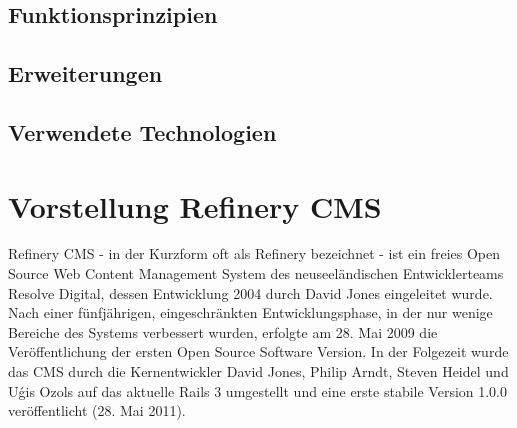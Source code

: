 \subsection{Funktionsprinzipien}
\subsection{Erweiterungen}
\subsection{Verwendete Technologien}

\newpage
\section{Vorstellung Refinery CMS}
Refinery CMS - in der Kurzform oft als Refinery bezeichnet - ist ein freies Open Source Web Content Management System des neuseeländischen Entwicklerteams Resolve Digital, dessen Entwicklung 2004 durch David Jones eingeleitet wurde. Nach einer fünfjährigen, eingeschränkten Entwicklungsphase, in der nur wenige Bereiche des Systems verbessert wurden, erfolgte am 28. Mai 2009 die Veröffentlichung der ersten Open Source Software Version. In der Folgezeit wurde das CMS durch die Kernentwickler David Jones, Philip Arndt, Steven Heidel und U\'{g}is Ozols auf das aktuelle Rails 3 umgestellt und eine erste stabile Version 1.0.0 veröffentlicht (28. Mai 2011).
